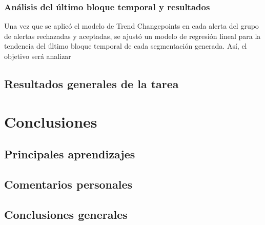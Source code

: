 \documentclass{article}[14pts]
\begin{document}
  \subsubsection{Análisis del último bloque temporal y resultados}

  Una vez que se aplicó el modelo de Trend Changepoints en cada alerta del grupo de alertas rechazadas y aceptadas, se ajustó un modelo de regresión lineal para la tendencia del último bloque temporal de cada segmentación generada. Así, el objetivo será analizar 
  

  \subsection{Resultados generales de la tarea}

\section{Conclusiones}

  \subsection{Principales aprendizajes}  
    
  \subsection{Comentarios personales}  

  \subsection{Conclusiones generales}  
\end{document}
